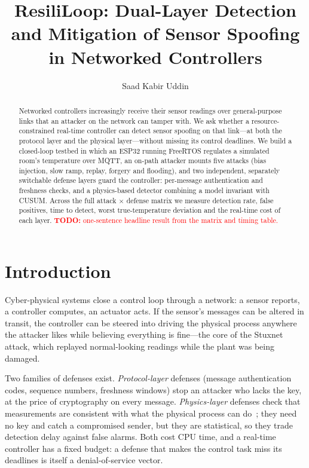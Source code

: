 \documentclass[10pt,twocolumn]{article}
\title{\textbf{ResiliLoop: Dual-Layer Detection and Mitigation of Sensor Spoofing in Networked Controllers}}
\author{Saad Kabir Uddin}
\date{}
\newcommand{\todo}[1]{\textcolor{red}{\textbf{TODO:} #1}}
\begin{document}
\maketitle

\begin{abstract}
Networked controllers increasingly receive their sensor readings over
general-purpose links that an attacker on the network can tamper with. We ask
whether a resource-constrained real-time controller can detect sensor spoofing
on that link---at both the protocol layer and the physical layer---without
missing its control deadlines. We build a closed-loop testbed in which an
ESP32 running FreeRTOS regulates a simulated room's temperature over MQTT,
an on-path attacker mounts five attacks (bias injection, slow ramp, replay,
forgery and flooding), and two independent, separately switchable defense
layers guard the controller: per-message authentication and freshness checks,
and a physics-based detector combining a model invariant with CUSUM.
Across the full attack $\times$ defense matrix we measure detection rate, false
positives, time to detect, worst true-temperature deviation and the real-time
cost of each layer. \todo{one-sentence headline result from the matrix and timing table.}
\end{abstract}

\section{Introduction}
Cyber-physical systems close a control loop through a network: a sensor
reports, a controller computes, an actuator acts. If the sensor's messages can
be altered in transit, the controller can be steered into driving the physical
process anywhere the attacker likes while believing everything is
fine---the core of the Stuxnet attack, which replayed normal-looking readings
while the plant was being damaged.

Two families of defenses exist. \emph{Protocol-layer} defenses (message
authentication codes, sequence numbers, freshness windows) stop an attacker who
lacks the key, at the price of cryptography on every message. \emph{Physics-layer}
defenses check that measurements are consistent with what the physical process
can do~\cite{cardenas2011,giraldo2018}; they need no key and catch a compromised
sender, but they are statistical, so they trade detection delay against false
alarms. Both cost CPU time, and a real-time controller has a fixed budget: a
defense that makes the control task miss its deadlines is itself a
denial-of-service vector.
\end{document}
